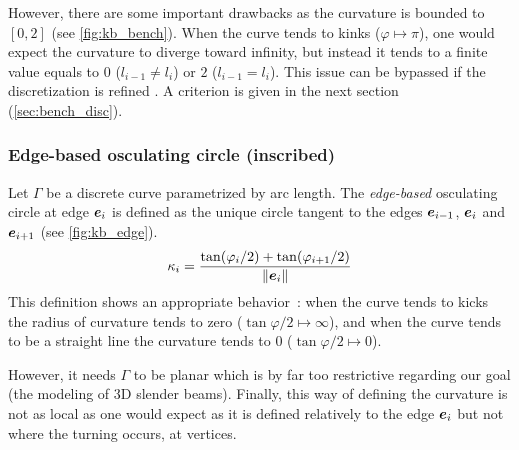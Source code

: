 However, there are some important drawbacks as the curvature is bounded to $[0,2]$ (see \cref{fig:kb_bench}). When the curve tends to kinks ($\varphi \mapsto \pi$), one would expect the curvature to diverge toward infinity, but instead it tends to a finite value equals to $0$ ($l_{i-1} \neq l_i$) or $2$ ($l_{i-1} = l_i$). This issue can be bypassed if the discretization is refined . A criterion is given in the next section (\cref{sec:bench_disc}).


\subsubsection{Edge-based osculating circle (inscribed)}
Let $\Gamma$ be a discrete curve parametrized by arc length. The \emph{edge-based} osculating circle at edge $\boldsymbol{e}_{i}$ is defined as the unique circle tangent to the edges $\boldsymbol{e}_{i-1}$, $\boldsymbol{e}_{i}$ and $\boldsymbol{e}_{i+1}$ (see \cref{fig:kb_edge}).
\begin{equation}
	\kappa_i = \frac{\tan(\varphi_i/2) + \tan(\varphi_{i+1}/2)}{\lVert\boldsymbol{e}_{i}\rVert}
\label{eq:def_kb_edge}
\end{equation}
This definition shows an appropriate behavior~: when the curve tends to kicks the radius of curvature tends to zero ($\tan \varphi/2 \mapsto \infty$), and when the curve tends to be a straight line the curvature tends to $0$ ($\tan \varphi/2 \mapsto 0$).

However, it needs $\Gamma$ to be planar which is by far too restrictive regarding our goal (the modeling of 3D slender beams). Finally, this way of defining the curvature is not as local as one would expect as it is defined relatively to the edge $\boldsymbol{e}_{i}$ but not where the turning occurs, at vertices.

